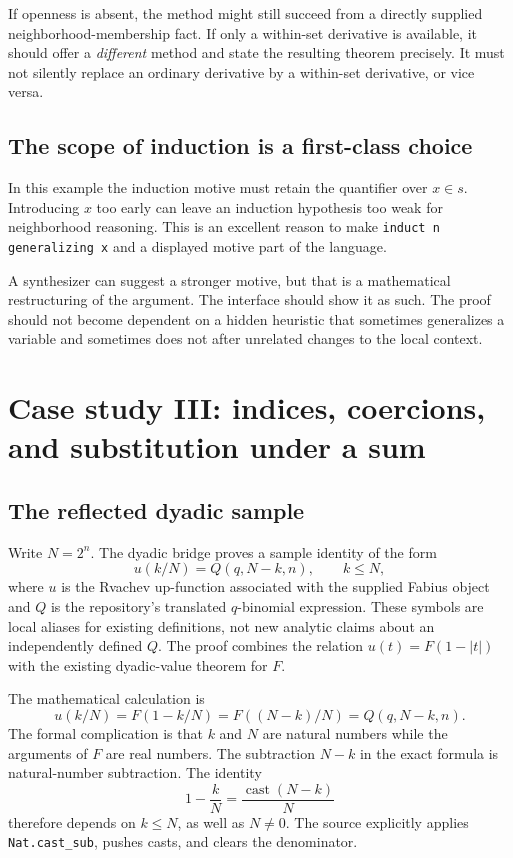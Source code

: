\documentclass[11pt,a4paper]{article}
\theoremstyle{remark}
\newcommand{\ty}[1]{\texttt{#1}}
\begin{document}
If openness is absent, the method might still succeed from a directly supplied neighborhood-membership fact. If only a within-set derivative is available, it should offer a \emph{different} method and state the resulting theorem precisely. It must not silently replace an ordinary derivative by a within-set derivative, or vice versa.

\subsection{The scope of induction is a first-class choice}
In this example the induction motive must retain the quantifier over $x\in s$. Introducing $x$ too early can leave an induction hypothesis too weak for neighborhood reasoning. This is an excellent reason to make \ty{induct n generalizing x} and a displayed motive part of the language.

A synthesizer can suggest a stronger motive, but that is a mathematical restructuring of the argument. The interface should show it as such. The proof should not become dependent on a hidden heuristic that sometimes generalizes a variable and sometimes does not after unrelated changes to the local context.

\section{Case study III: indices, coercions, and substitution under a sum}\label{sec:dyadic}

\subsection{The reflected dyadic sample}
Write $N=2^n$. The dyadic bridge proves a sample identity of the form
\begin{equation}\label{eq:sample}
 u(k/N)=Q(q,N-k,n),\qquad k\leq N,
\end{equation}
where $u$ is the Rvachev up-function associated with the supplied Fabius object and $Q$ is the repository's translated $q$-binomial expression. These symbols are local aliases for existing definitions, not new analytic claims about an independently defined $Q$. The proof combines the relation $u(t)=F(1-|t|)$ with the existing dyadic-value theorem for $F$.\cite{proveit-alias}

The mathematical calculation is
\[
 u(k/N)=F(1-k/N)=F((N-k)/N)=Q(q,N-k,n).
\]
The formal complication is that $k$ and $N$ are natural numbers while the arguments of $F$ are real numbers. The subtraction $N-k$ in the exact formula is natural-number subtraction. The identity
\begin{equation}\label{eq:castsub}
 1-\frac{k}{N}=\frac{\operatorname{cast}(N-k)}{N}
\end{equation}
therefore depends on $k\leq N$, as well as $N\neq0$. The source explicitly applies \ty{Nat.cast\_sub}, pushes casts, and clears the denominator.\cite{proveit-alias}
\end{document}
